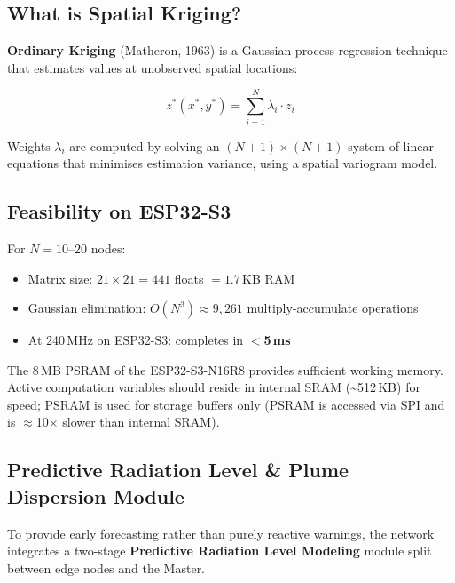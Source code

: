 \documentclass[12pt,a4paper]{article}
\begin{document}
\subsection{What is Spatial Kriging?}

\textbf{Ordinary Kriging} (Matheron, 1963) is a Gaussian process regression technique that estimates values at unobserved spatial locations:

\[
z^*(x^*, y^*) = \sum_{i=1}^{N} \lambda_i \cdot z_i
\]

Weights $\lambda_i$ are computed by solving an $(N+1)\times(N+1)$ system of linear equations that minimises estimation variance, using a spatial variogram model.

\subsection{Feasibility on ESP32-S3}

For $N = 10$--$20$ nodes:
\begin{itemize}
    \item Matrix size: $21 \times 21 = 441$ floats $= 1.7$\,KB RAM
    \item Gaussian elimination: $O(N^3) \approx 9{,}261$ multiply-accumulate operations
    \item At 240\,MHz on ESP32-S3: completes in \textbf{$<$5\,ms}
\end{itemize}

The 8\,MB PSRAM of the ESP32-S3-N16R8 provides sufficient working memory. Active computation variables should reside in internal SRAM (\textasciitilde512\,KB) for speed; PSRAM is used for storage buffers only (PSRAM is accessed via SPI and is $\approx$10$\times$ slower than internal SRAM).

\subsection{Predictive Radiation Level \& Plume Dispersion Module}

To provide early forecasting rather than purely reactive warnings, the network integrates a two-stage \textbf{Predictive Radiation Level Modeling} module split between edge nodes and the Master.
\end{document}
